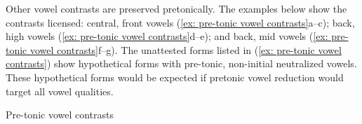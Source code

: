 Other vowel contrasts are preserved pretonically. The examples below show the contrasts licensed: central, front vowels (\ref{ex: pre-tonic vowel contrasts}a--c); back, high vowels (\ref{ex: pre-tonic vowel contrasts}d--e); and back, mid vowels (\ref{ex: pre-tonic vowel contrasts}f--g). The unattested forms listed in (\ref{ex: pre-tonic vowel contrasts}) show hypothetical forms with  pre-tonic, non-initial neutralized vowels. These hypothetical forms would be expected if pretonic vowel reduction would target all vowel qualities.

\ea\label{ex: pre-tonic vowel contrasts}
{Pre-tonic vowel contrasts}

